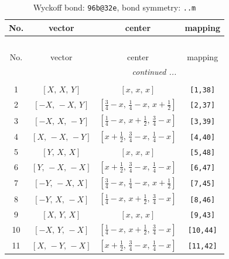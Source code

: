 \documentclass[fleqn,8pt]{jsarticle}
\begin{document}
\begin{longtable}{cccc}
\caption{Wyckoff bond: {\tt 96b@32e}, bond symmetry: {\tt ..m}}
 \\
 \hline \hline
No. & vector & center & mapping \\ \hline \endfirsthead

\multicolumn{3}{l}{\tablename\ \thetable{}} \\
 \hline \hline
No. & vector & center & mapping \\ \hline \endhead

 \hline \hline
\multicolumn{3}{r}{\footnotesize\it continued ...} \\ \endfoot

 \hline \hline
\multicolumn{3}{r}{} \\ \endlastfoot

1 & $\left[ X,\, X,\, Y \right]$ & $\left[ x,\, x,\, x \right]$ & {\tt [1,38]} \\ \hline
2 & $\left[ - X,\, - X,\, Y \right]$ & $\left[ \frac{3}{4} - x,\, \frac{1}{4} - x,\, x + \frac{1}{2} \right]$ & {\tt [2,37]} \\ \hline
3 & $\left[ - X,\, X,\, - Y \right]$ & $\left[ \frac{1}{4} - x,\, x + \frac{1}{2},\, \frac{3}{4} - x \right]$ & {\tt [3,39]} \\ \hline
4 & $\left[ X,\, - X,\, - Y \right]$ & $\left[ x + \frac{1}{2},\, \frac{3}{4} - x,\, \frac{1}{4} - x \right]$ & {\tt [4,40]} \\ \hline
5 & $\left[ Y,\, X,\, X \right]$ & $\left[ x,\, x,\, x \right]$ & {\tt [5,48]} \\ \hline
6 & $\left[ Y,\, - X,\, - X \right]$ & $\left[ x + \frac{1}{2},\, \frac{3}{4} - x,\, \frac{1}{4} - x \right]$ & {\tt [6,47]} \\ \hline
7 & $\left[ - Y,\, - X,\, X \right]$ & $\left[ \frac{3}{4} - x,\, \frac{1}{4} - x,\, x + \frac{1}{2} \right]$ & {\tt [7,45]} \\ \hline
8 & $\left[ - Y,\, X,\, - X \right]$ & $\left[ \frac{1}{4} - x,\, x + \frac{1}{2},\, \frac{3}{4} - x \right]$ & {\tt [8,46]} \\ \hline
9 & $\left[ X,\, Y,\, X \right]$ & $\left[ x,\, x,\, x \right]$ & {\tt [9,43]} \\ \hline
10 & $\left[ - X,\, Y,\, - X \right]$ & $\left[ \frac{1}{4} - x,\, x + \frac{1}{2},\, \frac{3}{4} - x \right]$ & {\tt [10,44]} \\ \hline
11 & $\left[ X,\, - Y,\, - X \right]$ & $\left[ x + \frac{1}{2},\, \frac{3}{4} - x,\, \frac{1}{4} - x \right]$ & {\tt [11,42]} \\ \hline

\end{longtable}
\end{document}
